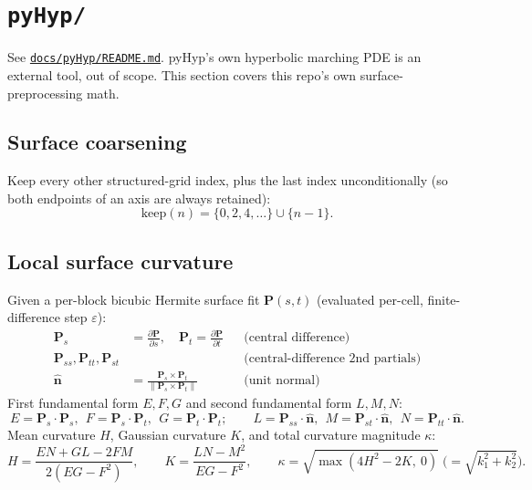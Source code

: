 \documentclass[11pt]{article}
\newcommand{\pd}[2]{\frac{\partial #1}{\partial #2}}
\newcommand{\vecb}[1]{\bm{#1}}
\begin{document}
\section{\texttt{pyHyp/}}
\label{sec:pyhyp}
See \href{https://github.com/kvishalrai/AeroHexMesh/blob/master/docs/pyHyp/README.md}{\texttt{docs/pyHyp/README.md}}.
pyHyp's own hyperbolic marching PDE is an external tool, out of scope.
This section covers this repo's own surface-preprocessing math.

\subsection{Surface coarsening}
Keep every other structured-grid index, plus the last index
unconditionally (so both endpoints of an axis are always retained):
\begin{equation}
\text{keep}(n) = \{0, 2, 4, \dots\} \cup \{n-1\}.
\end{equation}

\subsection{Local surface curvature}
\label{sec:curvature}
Given a per-block bicubic Hermite surface fit \(\vecb{P}(s,t)\)
(evaluated per-cell, finite-difference step \(\varepsilon\)):
\begin{align}
\vecb{P}_s &= \pd{\vecb{P}}{s}, \quad \vecb{P}_t = \pd{\vecb{P}}{t}
&&\text{(central difference)} \\
\vecb{P}_{ss}, \vecb{P}_{tt}, \vecb{P}_{st} &&&\text{(central-difference 2nd partials)} \\
\hat{\vecb{n}} &= \frac{\vecb{P}_s \times \vecb{P}_t}{\lVert \vecb{P}_s \times \vecb{P}_t \rVert}
&&\text{(unit normal)}
\end{align}
First fundamental form \(E,F,G\) and second fundamental form \(L,M,N\):
\begin{equation}
E = \vecb{P}_s\!\cdot\!\vecb{P}_s,\ \ F = \vecb{P}_s\!\cdot\!\vecb{P}_t,\ \ G = \vecb{P}_t\!\cdot\!\vecb{P}_t;
\qquad
L = \vecb{P}_{ss}\!\cdot\!\hat{\vecb{n}},\ \ M = \vecb{P}_{st}\!\cdot\!\hat{\vecb{n}},\ \ N = \vecb{P}_{tt}\!\cdot\!\hat{\vecb{n}} .
\end{equation}
Mean curvature \(H\), Gaussian curvature \(K\), and total curvature
magnitude \(\kappa\):
\begin{equation}
H = \frac{EN + GL - 2FM}{2(EG-F^2)}, \qquad
K = \frac{LN - M^2}{EG - F^2}, \qquad
\kappa = \sqrt{\max(4H^2 - 2K,\ 0)} \;\big(= \sqrt{k_1^2+k_2^2}\big).
\end{equation}
\end{document}
